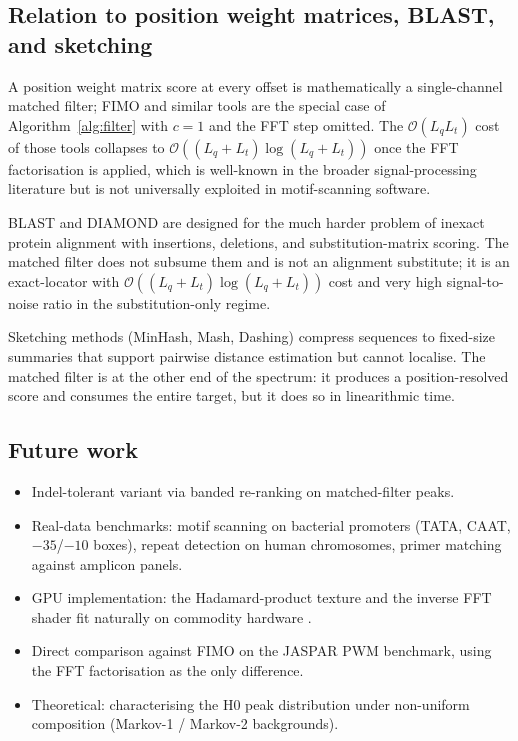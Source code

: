 \documentclass[twocolumn,11pt,a4paper]{article}
\theoremstyle{definition}
\theoremstyle{remark}
\newcommand{\bigO}{\mathcal{O}}
\begin{document}
\subsection{Relation to position weight matrices, BLAST, and sketching}

A position weight matrix score at every offset is mathematically a
single-channel matched filter; FIMO and similar tools
\citep{grant2011} are the special case of Algorithm~\ref{alg:filter}
with $c = 1$ and the FFT step omitted. The $\bigO(L_q L_t)$ cost of
those tools collapses to $\bigO((L_q + L_t) \log(L_q + L_t))$ once the
FFT factorisation is applied, which is well-known in the broader
signal-processing literature \citep{fischer1974} but is not
universally exploited in motif-scanning software.

BLAST \citep{altschul1990, altschul1997} and DIAMOND
\citep{buchfink2015} are designed for the much harder problem of
inexact protein alignment with insertions, deletions, and
substitution-matrix scoring. The matched filter does not subsume them
and is not an alignment substitute; it is an exact-locator with
$\bigO((L_q + L_t) \log(L_q + L_t))$ cost and very high signal-to-noise
ratio in the substitution-only regime.

Sketching methods (MinHash, Mash, Dashing) compress sequences to
fixed-size summaries that support pairwise distance estimation but
cannot localise. The matched filter is at the other end of the
spectrum: it produces a position-resolved score and consumes the
entire target, but it does so in linearithmic time.

\subsection{Future work}

\begin{itemize}
\item Indel-tolerant variant via banded re-ranking on matched-filter
peaks.
\item Real-data benchmarks: motif scanning on bacterial promoters
(TATA, CAAT, $-35$/$-10$ boxes), repeat detection on human
chromosomes, primer matching against amplicon panels.
\item GPU implementation: the Hadamard-product texture and the inverse
FFT shader fit naturally on commodity hardware
\citep{moreland2003, govindaraju2008, webgl2}.
\item Direct comparison against FIMO \citep{grant2011} on the JASPAR
PWM benchmark, using the FFT factorisation as the only difference.
\item Theoretical: characterising the H0 peak distribution under
non-uniform composition (Markov-1 / Markov-2 backgrounds).
\end{itemize}
\end{document}
